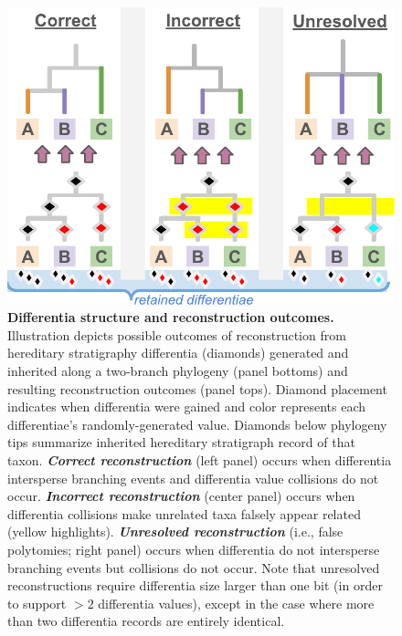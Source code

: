 \begin{figure}
  \centering
  \includegraphics[width=\linewidth]{img/hstrat-failure-modes}
  \caption{%
    \textbf{Differentia structure and reconstruction outcomes.}
    Illustration depicts possible outcomes of reconstruction from hereditary stratigraphy differentia (diamonds) generated and inherited along a two-branch phylogeny (panel bottoms) and resulting reconstruction outcomes (panel tops).
    Diamond placement indicates when differentia were gained and color represents each differentiae's randomly-generated value.
    Diamonds below phylogeny tips summarize inherited hereditary stratigraph record of that taxon.
    \textbf{\textit{Correct reconstruction}} (left panel) occurs when differentia intersperse branching events and differentia value collisions do not occur.
    \textbf{\textit{Incorrect reconstruction}} (center panel) occurs when differentia collisions make unrelated taxa falsely appear related (yellow highlights).
    \textbf{\textit{Unresolved reconstruction}} (i.e., false polytomies; right panel) occurs when differentia do not intersperse branching events but collisions do not occur.
    Note that unresolved reconstructions require differentia size larger than one bit (in order to support $>2$ differentia values), except in the case where more than two differentia records are entirely identical.
  }
  \label{fig:hstrat-failure-modes}
\end{figure}
